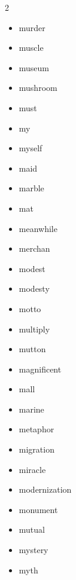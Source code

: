 \documentclass[../../book.tex]{subfiles}
\begin{document}
\begin{multicols}{2}
\begin{itemize}
\item[-] murder
\item[-] muscle
\item[-] museum
\item[-] mushroom
\item[-] must
\item[-] my
\item[-] myself
\item[-] maid
\item[-] marble
\item[-] mat
\item[-] meanwhile
\item[-] merchan
\item[-] modest
\item[-] modesty
\item[-] motto
\item[-] multiply
\item[-] mutton
\item[-] magnificent
\item[-] mall
\item[-] marine
\item[-] metaphor
\item[-] migration
\item[-] miracle
\item[-] modernization
\item[-] monument
\item[-] mutual
\item[-] mystery
\item[-] myth
\end{itemize}
\end{multicols}
\end{document}
